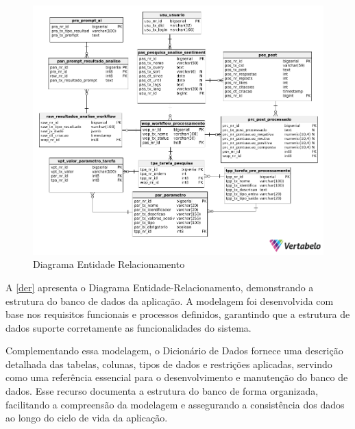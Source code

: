 \documentclass[
	12pt,				%
	oneside,			%
	a4paper,			%
	english,			%
	french,				%
	spanish,			%
	brazil				%
	]{abntex2}
\begin{document}
\begin{figure}[htbp]
\hypertarget{der}{%
\caption{Diagrama Entidade Relacionamento}\label{der}
\begin{center}
\includegraphics[scale=0.5]{imagens/sentilytics/diagramas/DER-sentilytics.png}
\end{center}
}
\end{figure}

A \autoref{der} apresenta o Diagrama Entidade-Relacionamento,
demonstrando a estrutura do banco de dados da aplicação. A modelagem foi
desenvolvida com base nos requisitos funcionais e processos definidos,
garantindo que a estrutura de dados suporte corretamente as
funcionalidades do sistema.

Complementando essa modelagem, o Dicionário de Dados fornece uma
descrição detalhada das tabelas, colunas, tipos de dados e restrições
aplicadas, servindo como uma referência essencial para o desenvolvimento
e manutenção do banco de dados. Esse recurso documenta a estrutura do
banco de forma organizada, facilitando a compreensão da modelagem e
assegurando a consistência dos dados ao longo do ciclo de vida da
aplicação.
\end{document}
